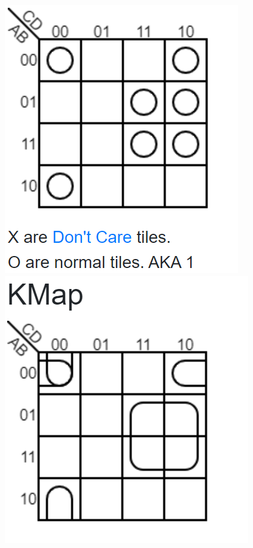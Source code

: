 \documentclass[10pt]{article}
\begin{document}
\begin{itemize}
\begin{enumerate}
\includegraphics[scale=.8]{Problem6kmap.png}
\includegraphics[scale=.8]{Problem6minimized.png}

\end{enumerate}
\end{itemize}
\end{document}
